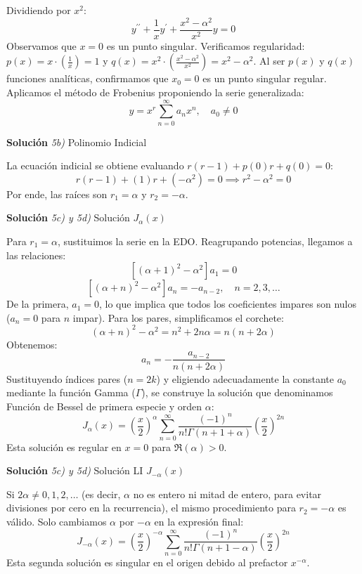 \documentclass[11pt,spanish]{article}
\begin{document}
Dividiendo por $x^2$:
$$y^{\prime\prime}+\frac{1}{x}y^{\prime}+\frac{x^{2}-\alpha^{2}}{x^{2}}y=0$$
Observamos que $x=0$ es un punto singular. Verificamos regularidad: $p(x) = x \cdot \left(\frac{1}{x}\right) = 1$ y $q(x) = x^2 \cdot \left(\frac{x^2-\alpha^2}{x^2}\right) = x^2 - \alpha^2$. Al ser $p(x)$ y $q(x)$ funciones analíticas, confirmamos que $x_0=0$ es un punto singular regular. Aplicamos el método de Frobenius proponiendo la serie generalizada:
$$y = x^r \sum_{n=0}^{\infty} a_n x^n, \quad a_0 \neq 0$$

\vspace{0.5cm}
{\bf Soluci\'on }{\em 5b)}
Polinomio Indicial
\vspace{0.5cm}

La ecuación indicial se obtiene evaluando $r(r-1) + p(0)r + q(0) = 0$:
$$r(r-1) + (1)r + (-\alpha^2) = 0 \implies r^2 - \alpha^2 = 0$$
Por ende, las raíces son $r_1 = \alpha$ y $r_2 = -\alpha$.


\vspace{0.5cm}
{\bf Soluci\'on }{\em 5c) y 5d)}
Solución $J_\alpha(x)$
\vspace{0.5cm}

Para $r_1 = \alpha$, sustituimos la serie en la EDO. Reagrupando potencias, llegamos a las relaciones:
$$[(\alpha+1)^{2}-\alpha^{2}]a_{1}=0$$
$$[(\alpha+n)^{2}-\alpha^{2}]a_{n}=-a_{n-2}, \quad n=2,3,\dots$$
De la primera, $a_1=0$, lo que implica que todos los coeficientes impares son nulos ($a_n = 0$ para $n$ impar). Para los pares, simplificamos el corchete:
$$(\alpha+n)^2 - \alpha^2 = n^2 + 2n\alpha = n(n+2\alpha)$$
Obtenemos:
$$a_n = -\frac{a_{n-2}}{n(n+2\alpha)}$$
Sustituyendo índices pares ($n=2k$) y eligiendo adecuadamente la constante $a_0$ mediante la función Gamma ($\Gamma$), se construye la solución que denominamos Función de Bessel de primera especie y orden $\alpha$:
$$J_{\alpha}(x)=\left(\frac{x}{2}\right)^{\alpha}\sum_{n=0}^{\infty}\frac{(-1)^{n}}{n!\Gamma(n+1+\alpha)}\left(\frac{x}{2}\right)^{2n}$$
Esta solución es regular en $x=0$ para $\Re(\alpha) > 0$.

\vspace{0.5cm}
{\bf Soluci\'on }{\em 5c) y 5d)}
Solución LI $J_{-\alpha}(x)$
\vspace{0.5cm}

Si $2\alpha \neq 0, 1, 2, \dots$ (es decir, $\alpha$ no es entero ni mitad de entero, para evitar divisiones por cero en la recurrencia), el mismo procedimiento para $r_2 = -\alpha$ es válido. Solo cambiamos $\alpha$ por $-\alpha$ en la expresión final:
$$J_{-\alpha}(x)=\left(\frac{x}{2}\right)^{-\alpha}\sum_{n=0}^{\infty}\frac{(-1)^{n}}{n!\Gamma(n+1-\alpha)}\left(\frac{x}{2}\right)^{2n}$$
Esta segunda solución es singular en el origen debido al prefactor $x^{-\alpha}$.
\end{document}
